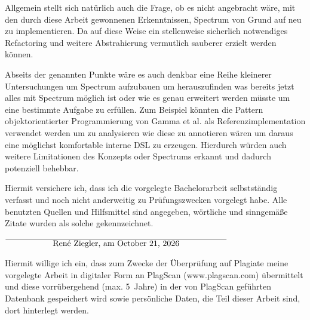 \documentclass[12pt,oneside,a4paper,parskip]{scrbook}
\def\BaAuthor{René Ziegler}
\begin{document}
Allgemein stellt sich natürlich auch die Frage, ob es nicht angebracht wäre, mit den durch diese Arbeit gewonnenen Erkenntnissen, Spectrum von Grund auf neu zu implementieren. Da auf diese Weise ein stellenweise sicherlich notwendiges Refactoring und weitere Abstrahierung vermutlich sauberer erzielt werden können.

Abseits der genannten Punkte wäre es auch denkbar eine Reihe kleinerer Untersuchungen um Spectrum aufzubauen um herauszufinden was bereits jetzt alles mit Spectrum möglich ist oder wie es genau erweitert werden müsste um eine bestimmte Aufgabe zu erfüllen. Zum Beispiel könnten die Pattern objektorientierter Programmierung von Gamma et al. als Referenzimplementation verwendet werden um zu analysieren wie diese zu annotieren wären um daraus eine möglichst komfortable interne DSL zu erzeugen. Hierdurch würden auch weitere Limitationen des Konzepts oder Spectrums erkannt und dadurch potenziell behebbar.

\appendix

\backmatter

\listoffigures
{}


\lstlistoflistings
{}

\printbibliography
{}



Hiermit versichere ich, dass ich die vorgelegte Bachelorarbeit selbstständig verfasst und noch nicht anderweitig zu Prüfungszwecken vorgelegt habe. Alle benutzten Quellen und Hilfsmittel sind angegeben, wörtliche und sinngemäße Zitate wurden als solche gekennzeichnet.

\vspace{20pt}
\begin{flushright}
$\overline{~~~~~~~~~~~~~~~~~\mbox{\BaAuthor, am \today}~~~~~~~~~~~~~~~~~}$
\end{flushright}


Hiermit willige ich ein, dass zum Zwecke der Überprüfung auf Plagiate meine vorgelegte Arbeit in digitaler Form an PlagScan (www.plagscan.com) übermittelt und diese vorrübergehend (max. 5~Jahre) in der von PlagScan geführten Datenbank gespeichert wird sowie persönliche Daten, die Teil dieser Arbeit sind, dort hinterlegt werden.
\end{document}
